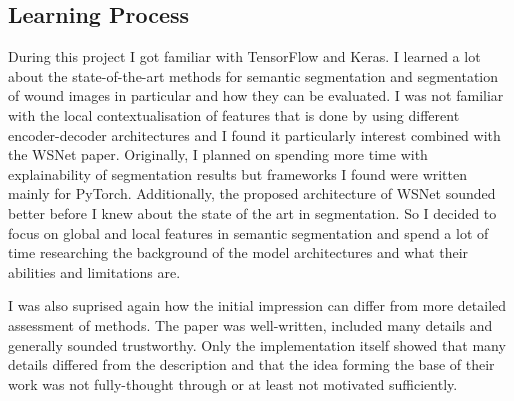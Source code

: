 \subsection{Learning Process}

During this project I got familiar with TensorFlow and Keras. I learned a lot about the state-of-the-art methods for semantic segmentation and segmentation of wound images in particular and how they can be evaluated. I was not familiar with the local contextualisation of features that is done by using different encoder-decoder architectures and I found it particularly interest combined with the WSNet paper. Originally, I planned on spending more time with explainability of segmentation results but frameworks I found were written mainly for PyTorch. Additionally, the proposed architecture of WSNet sounded better before I knew about the state of the art in segmentation. So I decided to focus on global and local features in semantic segmentation and spend a lot of time researching the background of the model architectures and what their abilities and limitations are.

I was also suprised again how the initial impression can differ from more detailed assessment of methods. The paper was well-written, included many details and generally sounded trustworthy. Only the implementation itself showed that many details differed from the description and that the idea forming the base of their work was not fully-thought through or at least not motivated sufficiently.
